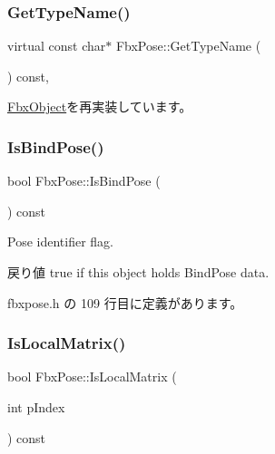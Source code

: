 \subsubsection{\texorpdfstring{Get\+Type\+Name()}{GetTypeName()}}
{\footnotesize\ttfamily virtual const char$\ast$ Fbx\+Pose\+::\+Get\+Type\+Name (\begin{DoxyParamCaption}{ }\end{DoxyParamCaption}) const\hspace{0.3cm}{\ttfamily [protected]}, {\ttfamily [virtual]}}



\hyperlink{class_fbx_object_a817dcfa8f7f7e2437324e1e71377c4b2}{Fbx\+Object}を再実装しています。

\mbox{\label{class_fbx_pose_a6fa3e2bc1aafcdfd958923eb628d6ad5}} 
\subsubsection{\texorpdfstring{Is\+Bind\+Pose()}{IsBindPose()}}
{\footnotesize\ttfamily bool Fbx\+Pose\+::\+Is\+Bind\+Pose (\begin{DoxyParamCaption}{ }\end{DoxyParamCaption}) const\hspace{0.3cm}{\ttfamily [inline]}}

Pose identifier flag. \begin{DoxyReturn}{戻り値}
{\ttfamily true} if this object holds Bind\+Pose data. 
\end{DoxyReturn}


 fbxpose.\+h の 109 行目に定義があります。

\mbox{\label{class_fbx_pose_a984ed3b9da9cc827ec15f910e79043c2}} 
\subsubsection{\texorpdfstring{Is\+Local\+Matrix()}{IsLocalMatrix()}}
{\footnotesize\ttfamily bool Fbx\+Pose\+::\+Is\+Local\+Matrix (\begin{DoxyParamCaption}\item[{int}]{p\+Index }\end{DoxyParamCaption}) const}

